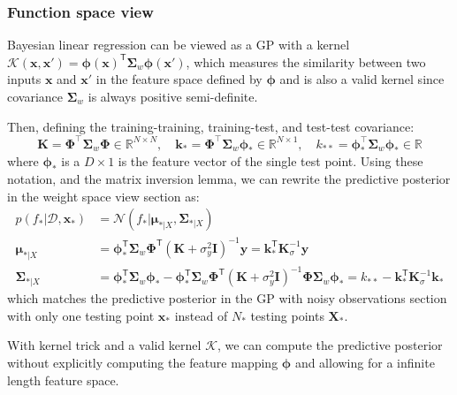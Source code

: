 \documentclass[11pt]{article}
\begin{document}
\subsubsection*{Function space view}
Bayesian linear regression can be viewed as a GP with a kernel $\mathcal{K}(\boldsymbol{x}, \boldsymbol{x}') = \boldsymbol{\phi}(\boldsymbol{x})^\mathsf{T} \boldsymbol{\Sigma}_w \boldsymbol{\phi}(\boldsymbol{x}')$, which measures the similarity between two inputs $\boldsymbol{x}$ and $\boldsymbol{x}'$ in the feature space defined by $\boldsymbol{\phi}$ and is also a valid
kernel since covariance $\boldsymbol{\Sigma}_w$ is always positive semi-definite.

Then, defining the training-training, training-test, and test-test covariance:
\[
\mathbf{K} = \boldsymbol{\Phi}^\top \boldsymbol{\Sigma}_w \boldsymbol{\Phi} \in \mathbb{R}^{N \times N}, \quad
\mathbf{k}_* = \boldsymbol{\Phi}^\top \boldsymbol{\Sigma}_w \boldsymbol{\phi}_* \in \mathbb{R}^{N \times 1}, \quad
k_{**} = \boldsymbol{\phi}_*^\top \boldsymbol{\Sigma}_w \boldsymbol{\phi}_* \in \mathbb{R}
\]
where $\boldsymbol{\phi}_*$ is a $D \times 1$ is the feature vector of the single test point.
Using these notation, and the matrix inversion lemma, we can rewrite the predictive posterior in the weight space view section as:
\[
\begin{aligned}
p(f_* | \mathcal{D}, \boldsymbol{x}_*) &= \mathcal{N}(f_* | \boldsymbol{\mu}_{*|X}, \boldsymbol{\Sigma}_{*|X}) \\
\boldsymbol{\mu}_{*|X} &= \boldsymbol{\phi}_*^\mathsf{T} \boldsymbol{\Sigma}_w \boldsymbol{\Phi}^\mathsf{T} (\mathbf{K} + \sigma_y^2 \mathbf{I})^{-1} \boldsymbol{y} = \boldsymbol{k}_*^\mathsf{T} \mathbf{K}_\sigma^{-1} \boldsymbol{y} \\
\boldsymbol{\Sigma}_{*|X} &= \boldsymbol{\phi}_*^\mathsf{T} \boldsymbol{\Sigma}_w \boldsymbol{\phi}_* - \boldsymbol{\phi}_*^\mathsf{T} \boldsymbol{\Sigma}_w \boldsymbol{\Phi}^\mathsf{T} (\mathbf{K} + \sigma_y^2 \mathbf{I})^{-1} \boldsymbol{\Phi} \boldsymbol{\Sigma}_w \boldsymbol{\phi}_* = k_{**} - \boldsymbol{k}_*^\mathsf{T} \mathbf{K}_\sigma^{-1} \boldsymbol{k}_*
\end{aligned}
\]
which matches the predictive posterior in the GP with noisy observations section with only one testing point $\boldsymbol{x}_*$ instead of $N_*$ testing points $\mathbf{X}_*$.

With kernel trick and a valid kernel $\mathcal{K}$, we can compute the predictive posterior without explicitly computing the feature mapping $\boldsymbol{\phi}$ and allowing for a infinite length feature space.
\end{document}
